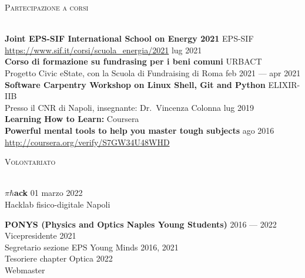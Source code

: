 \documentclass[a4paper]{article}
\newcommand{\lineunder} {
  \vspace*{-8pt} \\
  \hspace*{-18pt} \hrulefill \\
}
\newcommand{\header} [1] {
  {\hspace*{-18pt}\vspace*{6pt} \textsc{#1}}
  \vspace*{-6pt} \lineunder
}
\begin{document}
\header{Partecipazione a corsi}
\vspace{1mm}

\textbf{Joint EPS-SIF International School on Energy 2021} \hfill EPS-SIF \\
\url{https://www.sif.it/corsi/scuola_energia/2021} \hfill lug 2021 \\
\vspace*{2mm}
\textbf{Corso di formazione su fundrasing per i beni comuni} \hfill URBACT \\
Progetto Civic eState, con la Scuola di Fundraising di Roma \hfill feb 2021 --- apr 2021\\
\vspace*{2mm}
\textbf{Software Carpentry Workshop on Linux Shell, Git and Python} \hfill ELIXIR-IIB\\
Presso il CNR di Napoli, insegnante: Dr.\ Vincenza Colonna \hfill lug 2019\\
\vspace*{2mm}
\textbf{Learning How to Learn:} \hfill Coursera\\
\textbf{Powerful mental tools to help you master tough subjects} \hfill ago 2016\\
\url{http://coursera.org/verify/S7GW34U48WHD}\\
\vspace*{2mm}

\header{Volontariato}
\vspace{1mm}

\(\pi\hbar\)\textbf{ack} \hfill 01 marzo 2022 \\
Hacklab fisico-digitale \hfill Napoli \\
\vspace{2mm}

\textbf{PONYS (Physics and Optics Naples Young Students)} \hfill 2016 --- 2022\\
Vicepresidente \hfill 2021\\
Segretario sezione EPS Young Minds \hfill 2016, 2021\\
Tesoriere chapter Optica \hfill 2022\\
Webmaster\\
\vspace{2mm}
\end{document}
